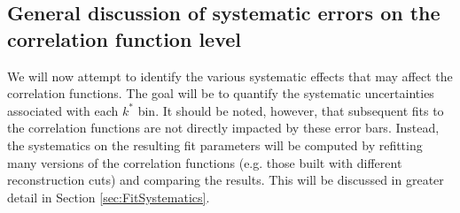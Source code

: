 


\subsection{General discussion of systematic errors on the correlation function level}
\label{sec:GeneralCfSysErrorDiscussion}

We will now attempt to identify the various systematic effects that may affect the correlation functions.  The goal will be to quantify the systematic uncertainties associated with each $k^*$ bin.  It should be noted, however, that subsequent fits to the correlation functions are not directly impacted by these error bars.  Instead, the systematics on the resulting fit parameters will be computed by refitting many versions of the correlation functions (e.g. those built with different reconstruction cuts) and comparing the results. This will be discussed in greater detail in Section \ref{sec:FitSystematics}.

